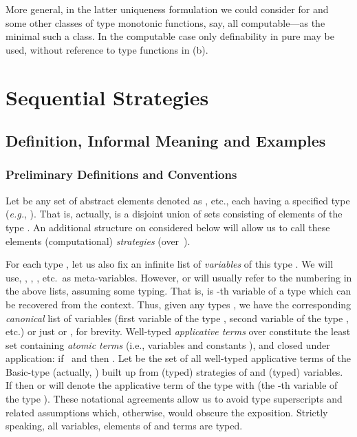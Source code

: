 \documentclass[fleqn]{LMCS}
\theoremstyle{plain}\newtheorem{satz}[thm]{Satz}
\theoremstyle{plain}\newtheorem{hyp}[thm]{Hypothesis}
\theoremstyle{plain}\newtheorem{hyps}[thm]{Hypotheses}
\theoremstyle{definition}\newtheorem{note}[thm]{Note}
\def\eg{{\em e.g.}}
\newcommand{\?}{\mbox{?}}
\begin{document}
\noindent
More general, in the latter uniqueness formulation 
we could consider for  and  
some other classes of type  
monotonic functions, say, all computable---as the minimal such a class. 
In the computable case only definability in pure  may be used, 
without reference to type  functions in (b). 

\vspace{1em}


\section{Sequential Strategies}\label{sec-seq-stra}
\subsection{Definition, Informal Meaning and Examples}
\label{sec-seq-stra-def}

\subsubsection{Preliminary Definitions and Conventions}
\label{sec-seq-stra-def-prelim}

\noindent
Let  be any set of abstract elements 
denoted as , etc., 
each having a specified type (\eg, ). 
That is, actually,  is a disjoint union of sets  
consisting of elements of the type . 
An additional structure on  considered below 
will allow us to call these elements (computational) {\em strategies\/} 
(over~).  


For each type , let us also fix an infinite list of 
\emph{variables} of this type . 
We will use, , , , etc.\ as meta-variables. 
However, 
 or  will usually refer 
to the numbering in the above lists, assuming some typing.  
That is,  is -th variable of a type which can 
be recovered from the context. 
Thus, given any types , 
we have the corresponding \emph{canonical} list 
of variables  
(first variable of the type , second 
variable of the type , etc.) 
or just  or , for brevity.  
Well-typed \emph{applicative terms} over  constitute the least 
set containing  
\emph{atomic terms} (i.e., variables  and constants ), 
and closed under application: 
if~ and  then . 
Let  be the set of all well-typed applicative 
terms of the \mbox{Basic-type} (actually, ) built up from 
(typed) strategies of  and (typed) variables. 
If  then 
 or  will denote 
the applicative term  of the type  
with  (the -th variable of the type ). 
These notational agreements allow us to avoid 
type superscripts and related assumptions 
which, otherwise, would obscure the exposition. 
Strictly speaking, all variables, elements 
of  and terms are typed. 
\end{document}

